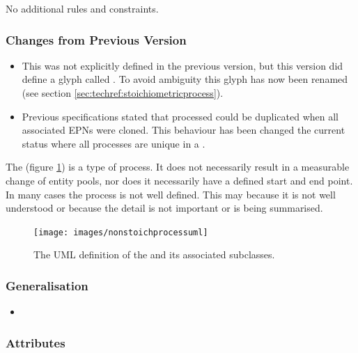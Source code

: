 No additional rules and constraints.

\subsubsection{Changes from Previous Version}
\begin{itemize}
\item This was not explicitly defined in the previous version, but
  this version did define a glyph called . To avoid
  ambiguity this glyph has now been renamed  (see section \ref{sec:techref:stoichiometricprocess}).
\item Previous specifications stated that processed could be
  duplicated when all associated EPNs were cloned. This behaviour has
  been changed the current status where all processes are unique in a \PDm.
\end{itemize}

\label{defn:NonStoichiometricProcess}

The  (figure \ref{fig:techref:nonstoichprocessuml})
is a type of process. It does not necessarily result in a measurable
change of entity pools, nor does it necessarily have a defined start
and end point. In many cases the process is not well defined. This may
because it is not well understood or because the detail is not
important or is being summarised.

\begin{figure}[htb]
  \centering
  \texttt{[image: images/nonstoichprocessuml]}
  \caption{The UML definition of the  and its
    associated subclasses.}
  \label{fig:techref:nonstoichprocessuml}
\end{figure}

\subsubsection{Generalisation}

\begin{itemize}
\item {}
\end{itemize}

\subsubsection{Attributes}


